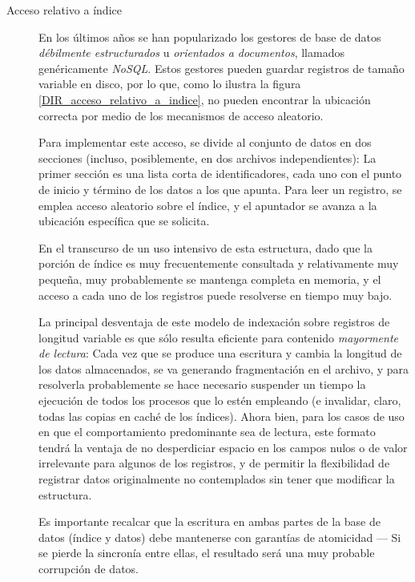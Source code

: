\documentclass[11pt,fleqn]{book} %
\begin{document}
\begin{description}
\item[Acceso relativo a índice] En los últimos años se han popularizado
     los gestores de base de datos \emph{débilmente estructurados} u \emph{orientados a      documentos}, llamados genéricamente \emph{NoSQL}. Estos gestores pueden
     guardar registros de tamaño variable en disco, por lo que, como
     lo ilustra la figura \ref{DIR_acceso_relativo_a_indice}, no
     pueden encontrar la ubicación correcta por medio de los
     mecanismos de acceso aleatorio.

     Para implementar este acceso, se divide al conjunto de datos en
     dos secciones (incluso, posiblemente, en dos archivos
     independientes): La primer sección es una lista corta de
     identificadores, cada uno con el punto de inicio y término de
     los datos a los que apunta. Para leer un registro, se emplea
     acceso aleatorio sobre el índice, y el apuntador se avanza a la
     ubicación específica que se solicita.

     En el transcurso de un uso intensivo de esta estructura, dado que
     la porción de índice es muy frecuentemente consultada y
     relativamente muy pequeña, muy probablemente se mantenga completa
     en memoria, y el acceso a cada uno de los registros puede
     resolverse en tiempo muy bajo.

     La principal desventaja de este modelo de indexación sobre
     registros de longitud variable es que sólo resulta eficiente
     para contenido \emph{mayormente de lectura}: Cada vez que se produce
     una escritura y cambia la longitud de los datos almacenados, se
     va generando fragmentación en el archivo, y para resolverla
     probablemente se hace necesario suspender un tiempo la ejecución
     de todos los procesos que lo estén empleando
     (e invalidar, claro, todas las copias en caché de los
     índices). Ahora bien, para los casos de uso en que el
     comportamiento predominante sea de
     lectura, este formato tendrá la ventaja de no desperdiciar
     espacio en los campos nulos o de valor irrelevante para algunos
     de los registros, y de permitir la flexibilidad de registrar
     datos originalmente no contemplados sin tener que modificar la
     estructura.

     Es importante recalcar que la escritura en ambas partes de la
     base de datos (índice y datos) debe mantenerse con garantías de
     atomicidad — Si se pierde la sincronía entre ellas, el resultado
     será una muy probable corrupción de datos.
\end{description}
\end{document}
